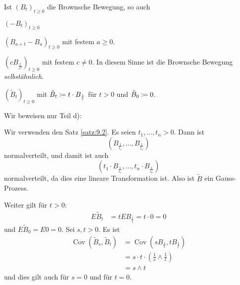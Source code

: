 \documentclass[a4paper,twoside,DIV15,BCOR12mm]{scrbook}
\begin{document}
\begin{satz}
\label{satz:9.3}
Ist $(B_t)_{t\ge0}$ die Brownsche Bewegung, so auch
\begin{enuma}
\item $(-B_t)_{t\ge 0}$
\item $(B_{a+t}-B_a)_{t\ge 0}$ mit festem $a\ge 0$. 
\item $(cB_{\frac t{c^2}})_{t\ge 0}$ mit festem $c\ne 0$. In diesem Sinne ist die Brownsche Bewegung \emph{selbstähnlich}.
\item $(\tilde B_t)_{t\ge0}$ mit $\tilde B_t \da t \cdot B_{\frac 1t}$ für $t>0$ und $\tilde B_0\da 0$.
\end{enuma}
\end{satz}

\begin{beweis}
Wir beweisen nur Teil d):

Wir verwenden den Satz \ref{satz:9.2}. Es seien $t_1,\ldots,t_n>0$. Dann ist
\[
(B_{\frac 1 {t_1}},\ldots,B_{\frac1{t_n}})
\]
normalverteilt, und damit ist auch
\[
(t_1\cdot B_{\frac 1 {t_1}},\ldots,t_n\cdot B_{\frac1{t_n}})
\]
normalverteilt, da dies eine lineare Transformation ist. Also ist $\tilde B$ ein Gauss-Prozess.

Weiter gilt für $t>0$:
\begin{align*}
E\tilde B_t &= t EB_{\frac 1 t} = t \cdot 0 = 0
\end{align*}
und $E\tilde B_0=E0=0$. Sei $s,t>0$. Es ist
\begin{align*}
\operatorname{Cov}(\tilde B_s, \tilde B_t) 
&= \operatorname{Cov}(sB_{\frac 1s}, tB_{\frac 1t}) \\
&= s\cdot t \cdot ( \frac 1s \wedge \frac1t) \\
&= s\wedge t
\end{align*}
und dies gilt auch für $s=0$ und für $t=0$.


\end{beweis}
\end{document}
